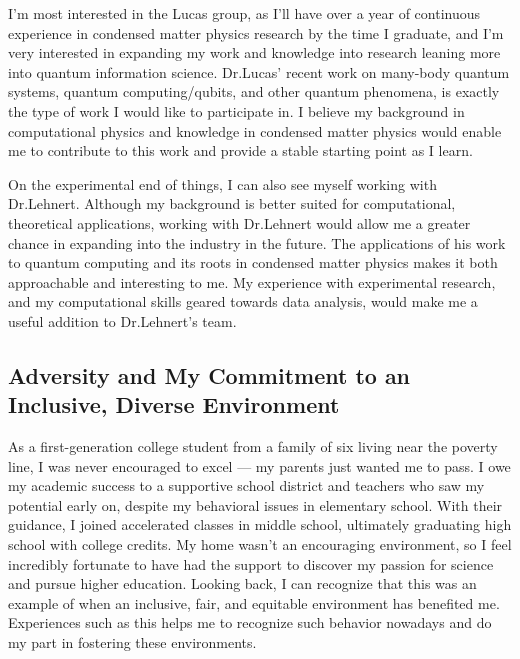 \documentclass[11pt]{article}
\begin{document}
I'm most interested in the Lucas group, as I'll have over a year of continuous experience in condensed matter physics research by the time I graduate, and I'm very interested in expanding my work and knowledge into research leaning more into quantum information science. Dr.\@ Lucas' recent work on many-body quantum systems, quantum computing/qubits, and other quantum phenomena, is exactly the type of work I would like to participate in. I believe my background in computational physics and knowledge in condensed matter physics would enable me to contribute to this work and provide a stable starting point as I learn.

On the experimental end of things, I can also see myself working with Dr.\@ Lehnert. Although my background is better suited for computational, theoretical applications, working with Dr.\@ Lehnert would allow me a greater chance in expanding into the industry in the future. The applications of his work to quantum computing and its roots in condensed matter physics makes it both approachable and interesting to me. My experience with experimental research, and my computational skills geared towards data analysis, would make me a useful addition to Dr.\@ Lehnert's team.
\pagebreak

\subsection*{Adversity and My Commitment to an Inclusive, Diverse Environment}
As a first-generation college student from a family of six living near the poverty line, I was never encouraged to excel --- my parents just wanted me to pass. I owe my academic success to a supportive school district and teachers who saw my potential early on, despite my behavioral issues in elementary school. With their guidance, I joined accelerated classes in middle school, ultimately graduating high school with college credits. My home wasn't an encouraging environment, so I feel incredibly fortunate to have had the support to discover my passion for science and pursue higher education. Looking back, I can recognize that this was an example of when an inclusive, fair, and equitable environment has benefited me. Experiences such as this helps me to recognize such behavior nowadays and do my part in fostering these environments.
\end{document}
